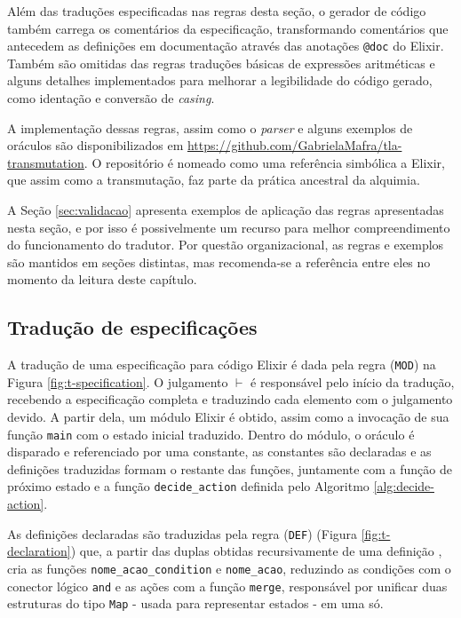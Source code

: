 Além das traduções especificadas nas regras desta seção, o gerador de código
também carrega os comentários da especificação, transformando comentários que
antecedem as definições em documentação através das anotações \texttt{@doc} do
Elixir. Também são omitidas das regras traduções básicas de expressões
aritméticas e alguns detalhes implementados para melhorar a legibilidade do
código gerado, como identação e conversão de \textit{casing}. 

A implementação dessas regras, assim como o \textit{parser} e alguns exemplos de
oráculos são disponibilizados em
\url{https://github.com/GabrielaMafra/tla-transmutation}. O repositório é
nomeado como uma referência simbólica a Elixir, que assim como a transmutação,
faz parte da prática ancestral da alquimia.

A Seção \ref{sec:validacao} apresenta exemplos de aplicação das regras
apresentadas nesta seção, e por isso é possivelmente um recurso para melhor
compreendimento do funcionamento do tradutor. Por questão organizacional, as
regras e exemplos são mantidos em seções distintas, mas recomenda-se a
referência entre eles no momento da leitura deste capítulo.

\subsection{Tradução de especificações}



A tradução de uma especificação para código Elixir é dada pela regra
(\texttt{MOD}) na Figura \ref{fig:t-specification}. O julgamento $\vdash$ é responsável pelo início da tradução, recebendo a
especificação completa e traduzindo cada elemento com o julgamento devido.
A partir dela, um módulo Elixir é obtido, assim como a invocação de sua
função \texttt{main} com o estado inicial traduzido. Dentro do módulo, o oráculo
é disparado e referenciado por uma constante, as constantes são declaradas e as
definições traduzidas formam o restante das funções, juntamente com a função de
próximo estado e a função \texttt{decide\_action} definida pelo Algoritmo \ref{alg:decide-action}.

As definições declaradas são traduzidas pela regra (\texttt{DEF}) (Figura
\ref{fig:t-declaration}) que, a partir das duplas
obtidas recursivamente de uma definição \FANCYAA, cria as funções \texttt{nome\_acao\_condition} 
e \texttt{nome\_acao}, reduzindo as condições com o conector lógico \texttt{and}
e as ações com a função \texttt{merge}, responsável por unificar duas
estruturas do tipo \texttt{Map} - usada para representar estados - em uma só.

